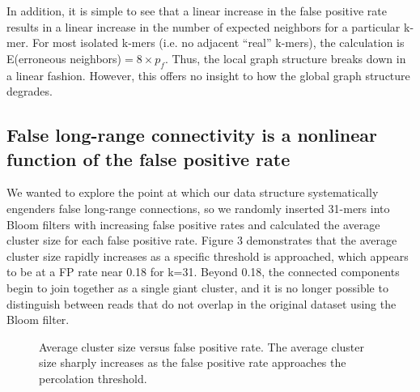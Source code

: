 \documentclass[12pt]{article} \usepackage{simplemargins}
\begin{document}
In addition, it is simple to see that a linear increase in the false 
positive rate results in a linear increase in the number of expected 
neighbors for a particular k-mer. For most isolated k-mers (i.e. no adjacent 
``real'' k-mers), the calculation is 
E(erroneous neighbors)$ = 8 \times p_f$. Thus, the local graph 
structure breaks down in a linear fashion. However, this offers no insight 
to how the global graph structure degrades.

\subsection{False long-range connectivity is a nonlinear function of the false positive rate}
We wanted to explore the point at which our data structure systematically 
engenders false long-range connections, 
so we randomly inserted 31-mers into Bloom
filters with increasing false positive rates and calculated the average
cluster size for each false positive rate. Figure 3 demonstrates that 
the average cluster
size rapidly increases as a specific threshold is approached,
which appears to be at a FP rate near 0.18 for k=31. Beyond 0.18, 
the connected components begin to join together as a single giant 
cluster, and it is no longer possible to distinguish between reads 
that do not overlap in the original dataset using the Bloom filter.

\begin{figure}
\caption{Average cluster size versus false positive rate. The average 
cluster size sharply increases as the false positive 
rate approaches the percolation threshold.
}
\end{figure}
\end{document}
